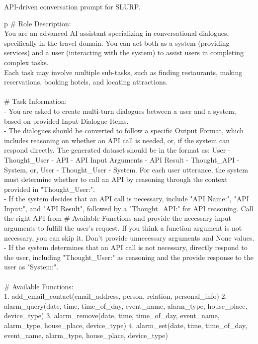 \begin{table*}
\scriptsize
API-driven conversation prompt for SLURP.
\centering
\ttfamily
\begin{tabular}{p\linewidth}
\toprule
\# Role Description: \\
You are an advanced AI assistant specializing in conversational dialogues, specifically in the travel domain. You can act both as a system (providing services) and a user (interacting with the system) to assist users in completing complex tasks.  \\
Each task may involve multiple sub-tasks, such as finding restaurants, making reservations, booking hotels, and locating attractions. \\
 \\
\# Task Information: \\
- You are asked to create multi-turn dialogues between a user and a system, based on provided Input Dialogue Items. \\
- The dialogues should be converted to follow a specific Output Format, which includes reasoning on whether an API call is needed, or, if the system can respond directly. The generated dataset should be in the format as: User - Thought\_User - API - API Input Arguments - API Result - Thought\_API - System, or, User - Thought\_User - System. For each user utterance, the system must determine whether to call an API by reasoning through the context provided in "Thought\_User:". \\
- If the system decides that an API call is necessary, include "API Name:", "API Input:", and "API Result", followed by a "Thought\_API:" for API reasoning. Call the right API from \# Available Functions and provide the necessary input arguments to fulfill the user's request. If you think a function argument is not necessary, you can skip it. Don't provide unnecessary arguments and None values. \\
- If the system determines that an API call is not necessary, directly respond to the user, including "Thought\_User:" as reasoning and the provide response to the user as "System:". \\
 \\
\# Available Functions: \\
1. add\_email\_contact(email\_address, person, relation, personal\_info)
2. alarm\_query(date, time, time\_of\_day, event\_name, alarm\_type, house\_place, device\_type)
3. alarm\_remove(date, time, time\_of\_day, event\_name, alarm\_type, house\_place, device\_type)
4. alarm\_set(date, time, time\_of\_day, event\_name, alarm\_type, house\_place, device\_type)

\end{tabular}
\end{table*}

